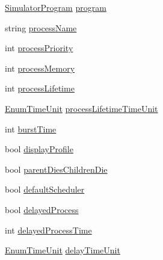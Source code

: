 \begin{DoxyCompactItemize}
\item 
\hyperlink{class_c_p_u___o_s___simulator_1_1_c_p_u_1_1_simulator_program}{Simulator\+Program} \hyperlink{struct_c_p_u___o_s___simulator_1_1_operating___system_1_1_process_flags_addf9316ebaddcec9f466b0317d15d45c}{program}
\item 
string \hyperlink{struct_c_p_u___o_s___simulator_1_1_operating___system_1_1_process_flags_a2823e57851d2940c47cd06afd0487360}{process\+Name}
\item 
int \hyperlink{struct_c_p_u___o_s___simulator_1_1_operating___system_1_1_process_flags_a0a14c1f617bd3cd4d2b28b5f13cf83d5}{process\+Priority}
\item 
int \hyperlink{struct_c_p_u___o_s___simulator_1_1_operating___system_1_1_process_flags_a2ed1133d00c4d6d39f9e5cd70febbacb}{process\+Memory}
\item 
int \hyperlink{struct_c_p_u___o_s___simulator_1_1_operating___system_1_1_process_flags_a45de0517d0705f5c9ff1322e969cae20}{process\+Lifetime}
\item 
\hyperlink{namespace_c_p_u___o_s___simulator_1_1_operating___system_a0553d0bc2513aec52caa769acf994d5c}{Enum\+Time\+Unit} \hyperlink{struct_c_p_u___o_s___simulator_1_1_operating___system_1_1_process_flags_af7b24dbd3fd07741d54984f6261694f6}{process\+Lifetime\+Time\+Unit}
\item 
int \hyperlink{struct_c_p_u___o_s___simulator_1_1_operating___system_1_1_process_flags_ac0e98ee86de3c22c7a022e3dcd69935f}{burst\+Time}
\item 
bool \hyperlink{struct_c_p_u___o_s___simulator_1_1_operating___system_1_1_process_flags_a8290519886f3517f690f3acba8330440}{display\+Profile}
\item 
bool \hyperlink{struct_c_p_u___o_s___simulator_1_1_operating___system_1_1_process_flags_a8ef3875fcd47a5f1fa37b61a2979b813}{parent\+Dies\+Children\+Die}
\item 
bool \hyperlink{struct_c_p_u___o_s___simulator_1_1_operating___system_1_1_process_flags_a927e8e998250ab57385146cf8dd487b8}{default\+Scheduler}
\item 
bool \hyperlink{struct_c_p_u___o_s___simulator_1_1_operating___system_1_1_process_flags_ac6a4a5a7465da7e567a655cae4dd1aa4}{delayed\+Process}
\item 
int \hyperlink{struct_c_p_u___o_s___simulator_1_1_operating___system_1_1_process_flags_a9b9ff1ea252f64035813f0f478d705ae}{delayed\+Process\+Time}
\item 
\hyperlink{namespace_c_p_u___o_s___simulator_1_1_operating___system_a0553d0bc2513aec52caa769acf994d5c}{Enum\+Time\+Unit} \hyperlink{struct_c_p_u___o_s___simulator_1_1_operating___system_1_1_process_flags_a0e5e535ff000e1b630180443c2295776}{delay\+Time\+Unit}

\end{DoxyCompactItemize}
